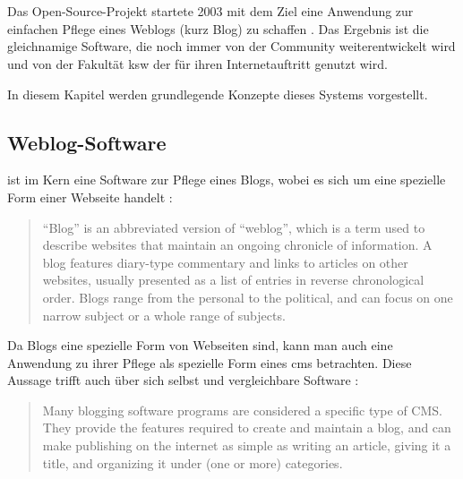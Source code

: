 \section{\wordpress}
    \label{section:WordPress}
    Das Open-Source-Projekt {\wordpress} startete 2003
    mit dem Ziel eine Anwendung zur einfachen Pflege eines Weblogs
    (kurz Blog) zu schaffen \cite{wordpress:About}.
    Das Ergebnis ist die gleichnamige Software,
    die noch immer von der Community weiterentwickelt wird
    und von der Fakultät \gls{ksw} der {\fernUni} für ihren
    Internetauftritt genutzt wird.

    In diesem Kapitel werden grundlegende Konzepte dieses Systems vorgestellt.

    \subsection{Weblog-Software}
        \label{section:weblogSoftware}
        {\wordpress} ist im Kern eine Software zur Pflege eines Blogs,
        wobei es sich um eine spezielle Form einer Webseite handelt
        \cite{wordpress:Blogging}:

        \begin{quote}
            "`Blog"' is an abbreviated version of "`weblog"',
            which is a term used to describe websites that maintain
            an ongoing chronicle of information.
            A blog features diary-type commentary and links to articles
            on other websites, usually presented as a list of entries in
            reverse chronological order.
            Blogs range from the personal to the political,
            and can focus on one narrow subject or a whole range of subjects.
        \end{quote}

        Da Blogs eine spezielle Form von Webseiten sind,
        kann man auch eine Anwendung zu ihrer Pflege als
        spezielle Form eines \gls{cms} betrachten.
        Diese Aussage trifft {\wordpress} auch über sich selbst
        und vergleichbare Software \cite{wordpress:Blogging}:

        \begin{quote}
            Many blogging software programs are considered a specific type of CMS.
            They provide the features required to create and maintain a blog,
            and can make publishing on the internet as simple as writing an article,
            giving it a title, and organizing it under (one or more) categories.
        \end{quote}

